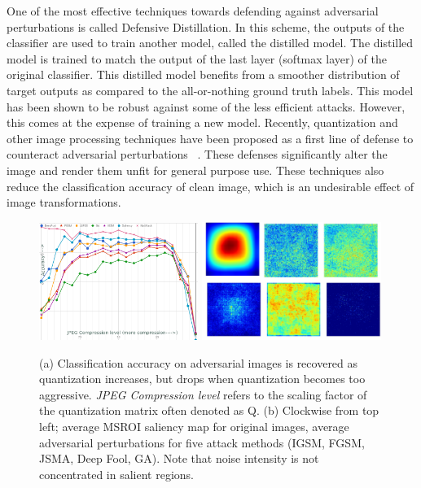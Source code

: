 One of the most effective techniques towards defending against adversarial perturbations is called Defensive Distillation.
In this scheme, the outputs of the classifier are used to train another model, called the distilled model. 
The distilled model is trained to match the output of the last layer (softmax layer) of the original classifier.
This distilled model benefits from a smoother distribution of target outputs as compared to the all-or-nothing ground truth labels.
This model has been shown to be robust against some of the less efficient attacks.
However, this comes at the expense of training a new model.
Recently, quantization and other image processing techniques have been proposed as a first line of defense to counteract adversarial perturbations ~\cite{liang2017detecting,aadityaprakash2018,guo2017countering}. 
These defenses significantly alter the image and render them unfit for general purpose use.
These techniques also reduce the classification accuracy of clean image, which is an undesirable effect of image transformations.

\begin{figure}
    \centering
     \includegraphics[width=0.46\textwidth,angle=0]{figures/protect/jpeg_study.png}
     \includegraphics[width=0.52\textwidth,angle=0]{figures/protect/drawing_noise.jpg}
     \label{fig:jpeg}
     \caption[JPEG under attack]{(a) Classification accuracy on adversarial images is recovered as quantization increases, but drops when quantization becomes too aggressive. \textit{JPEG Compression level} refers to the scaling factor of the quantization matrix often denoted as Q. (b) Clockwise from top left; average MSROI saliency map for original images, average adversarial perturbations for five attack methods (IGSM, FGSM, JSMA, Deep Fool, GA).  Note that noise intensity is not concentrated in salient regions.}
 \end{figure}


